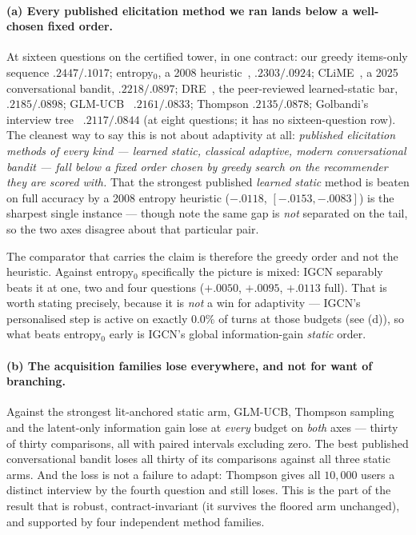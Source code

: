 \documentclass[11pt]{article}
\begin{document}
\paragraph{(a) Every published elicitation method we ran lands below a well-chosen fixed order.}
At sixteen questions on the certified tower, in one contract: our greedy items-only sequence
$.2447/.1017$; entropy$_0$, a 2008 heuristic~\cite{rashid2008learning}, $.2303/.0924$;
CLiME~\cite{liu2025clisk}, a 2025 conversational bandit, $.2218/.0897$; DRE~\cite{kweon2020deep},
the peer-reviewed learned-static bar, $.2185/.0898$; GLM-UCB~\cite{zhao2013interactive}
$.2161/.0833$; Thompson $.2135/.0878$; Golbandi's interview tree~\cite{golbandi2011adaptive}
$.2117/.0844$ (at eight questions; it has no sixteen-question row). The cleanest way to say this is
not about adaptivity at all: \emph{published elicitation methods of every kind --- learned static,
classical adaptive, modern conversational bandit --- fall below a fixed order chosen by greedy
search on the recommender they are scored with.} That the strongest published \emph{learned static}
method is beaten on full accuracy by a 2008 entropy heuristic ($-.0118$, $[-.0153,-.0083]$) is the
sharpest single instance --- though note the same gap is \emph{not} separated on the tail, so the
two axes disagree about that particular pair.

The comparator that carries the claim is therefore the greedy order and not the heuristic. Against
entropy$_0$ specifically the picture is mixed: IGCN separably beats it at one, two and four
questions ($+.0050$, $+.0095$, $+.0113$ full). That is worth stating precisely, because it is
\emph{not} a win for adaptivity --- IGCN's personalised step is active on exactly $0.0\%$ of turns
at those budgets (see (d)), so what beats entropy$_0$ early is IGCN's global information-gain
\emph{static} order.

\paragraph{(b) The acquisition families lose everywhere, and not for want of branching.}
Against the strongest lit-anchored static arm, GLM-UCB, Thompson sampling and the latent-only
information gain lose at \emph{every} budget on \emph{both} axes --- thirty of thirty comparisons,
all with paired intervals excluding zero. The best published conversational bandit loses all thirty
of its comparisons against all three static arms. And the loss is not a failure to adapt: Thompson
gives all $10{,}000$ users a distinct interview by the fourth question and still loses. This is the
part of the result that is robust, contract-invariant (it survives the floored arm unchanged), and
supported by four independent method families.
\end{document}
